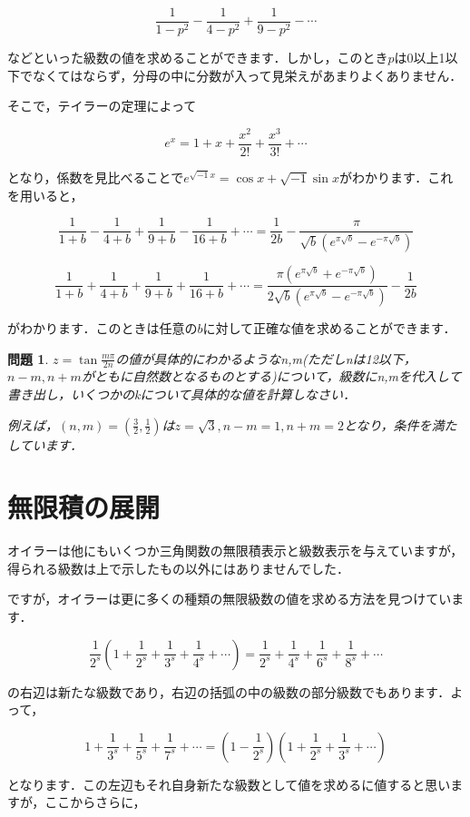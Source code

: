 \documentclass[./main]{subfiles}
\theoremstyle{break}
\newtheorem*{prb}{問題}
\begin{document}
\[\frac{1}{1-p^2}-\frac{1}{4-p^2}+\frac{1}{9-p^2}-\cdots\]

などといった級数の値を求めることができます．しかし，このとき$p$は0以上1以下でなくてはならず，分母の中に分数が入って見栄えがあまりよくありません．

そこで，テイラーの定理によって

\[e^x=1+x+\frac{x^2}{2!}+\frac{x^3}{3!}+\cdots\]

となり，係数を見比べることで$e^{\sqrt{-1}x}=\cos x+\sqrt{-1}\sin x$がわかります．これを用いると，

\[\frac{1}{1+b}-\frac{1}{4+b}+\frac{1}{9+b}-\frac{1}{16+b}+\cdots=\frac{1}{2b}-\frac{\pi}{\sqrt{b}(e^{\pi\sqrt{b}}-e^{-\pi\sqrt{b}})}\]

\[\frac{1}{1+b}+\frac{1}{4+b}+\frac{1}{9+b}+\frac{1}{16+b}+\cdots=\frac{\pi(e^{\pi\sqrt{b}}+e^{-\pi\sqrt{b}})}{2\sqrt{b}(e^{\pi\sqrt{b}}-e^{-\pi\sqrt{b}})}-\frac{1}{2b}\]

がわかります．このときは任意の$b$に対して正確な値を求めることができます．

\begin{prb}
$z=\tan\frac{m\pi}{2n}$の値が具体的にわかるようなn,m(ただしnは12以下，$n-m,n+m$がともに自然数となるものとする)について，級数にn,mを代入して書き出し，いくつかのkについて具体的な値を計算しなさい．

例えば，$(n,m)=(\frac{3}{2},\frac{1}{2})$は$z=\sqrt{3},n-m=1,n+m=2$となり，条件を満たしています．
\end{prb}
\section{無限積の展開}
オイラーは他にもいくつか三角関数の無限積表示と級数表示を与えていますが，得られる級数は上で示したもの以外にはありませんでした．

ですが，オイラーは更に多くの種類の無限級数の値を求める方法を見つけています．

\[\frac{1}{2^s}\left( 1+\frac{1}{2^s}+\frac{1}{3^s}+\frac{1}{4^s}+\cdots \right)=\frac{1}{2^s}+\frac{1}{4^s}+\frac{1}{6^s}+\frac{1}{8^s}+\cdots\]

の右辺は新たな級数であり，右辺の括弧の中の級数の部分級数でもあります．よって，

\[1+\frac{1}{3^s}+\frac{1}{5^s}+\frac{1}{7^s}+\cdots=\left( 1-\frac{1}{2^s} \right)\left( 1+\frac{1}{2^s}+\frac{1}{3^s}+\cdots \right)\]

となります．この左辺もそれ自身新たな級数として値を求めるに値すると思いますが，ここからさらに，
\end{document}
